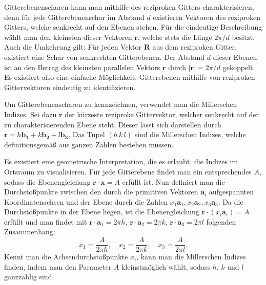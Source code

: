 Gitterebenenscharen kann man mithilfe des reziproken Gitters charakterisieren, denn für jede
Gitterebenenschar im Abstand $d$ existieren Vektoren des reziproken Gitters, welche senkrecht auf den Ebenen stehen.
Für die eindeutige Beschreibung wählt man den kleinsten dieser Vektoren $\mathbf{r}$, welche stets die Länge $2 \pi / d$ besitzt.
Auch die Umkehrung gilt: Für jeden Vektor $\mathbf{R}$ aus dem reziproken Gitter, existiert eine Schar von senkrechten
Gitterebenen.
Der Abstand $d$ dieser Ebenen ist an den Betrag des kleinsten parallelen Vektors $\mathbf{r}$ durch $\lvert \mathbf{r}
\rvert=2\pi  /d$ gekoppelt.
Es existiert also eine einfache Möglichkeit, Gitterebenen mithilfe von reziproken Gittervektoren eindeutig zu
identifizieren. \autocite[113]{Ashcroft}

Um Gitterebenenscharen zu kennzeichnen, verwendet man die Millerschen Indizes.
Sei dazu $\mathbf{r}$ der kürzeste reziproke Gittervektor, welcher senkrecht auf der zu charakterisierenden Ebene steht.
Dieser lässt sich darstellen durch $ \mathbf{r} = h \mathbf{b_1} + k \mathbf{b_2} + l \mathbf{b_3}$.
Das Tupel $(h\, k\,l)$ sind die Millerschen Indizes, welche definitionsgemäß aus ganzen Zahlen bestehen müssen.


Es existiert eine geometrische Interpretation, die es erlaubt, die Indizes im Ortsraum zu
visualisieren.
Für jede Gitterebene findet man ein entsprechendes $A$, sodass die Ebenengleichung $\mathbf{r} \cdot \mathbf{x} = A$
erfüllt ist.
Nun definiert man die Durchstoßpunkte zwischen den durch die primitiven Vektoren $\mathbf{a}_i$ aufgespannten
Koordinatenachsen und der Ebene durch die Zahlen $x_{1}\mathbf{a}_{1}, x_{2}\mathbf{a}_{2}, x_{3}\mathbf{a}_{3}$.
Da die Durchstoßpunkte in der Ebene liegen, ist die Ebenengleichung $\mathbf{r}\cdot(x_{i}\mathbf{a}_{i})=A$ erfüllt und
man findet mit $\mathbf{r}\cdot\mathbf{a}_{1}=2\pi h$, $\mathbf{r}\cdot \mathbf{a}_{2}=2\pi k$,
$ \mathbf{r}\cdot \mathbf{a}_{3}=2\pi l$ folgenden Zusammenhang:
\begin{equation*}
    x_{1}=\frac{A}{2\pi h}, \quad x_{2}=\frac{A}{2\pi k}, \quad x_{3} =\frac{A}{2\pi l}.
\end{equation*}
Kennt man die Achsendurchstoßpunkte $x_i$, kann man die Millerschen Indizes finden, indem man den Parameter $A$
kleinstmöglich wählt, sodass $h$, $k$ und $l$ ganzzahlig sind. \autocite[115]{Ashcroft}

